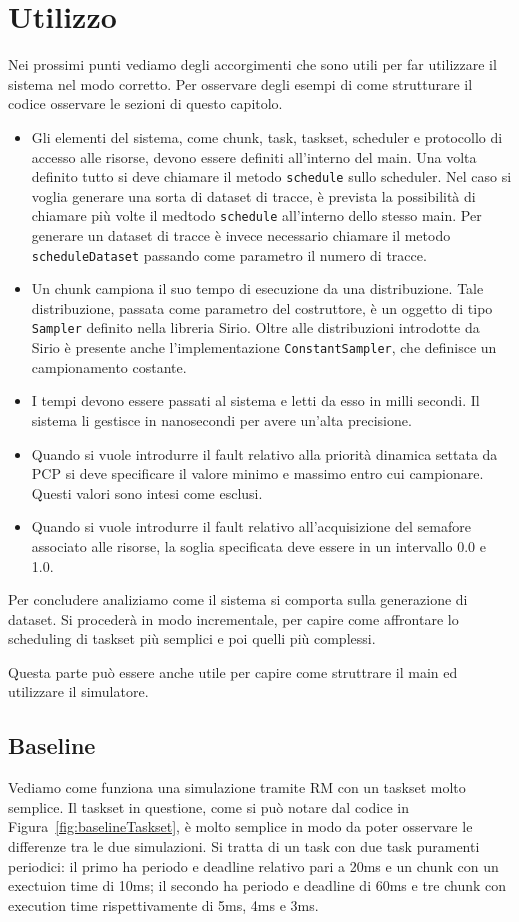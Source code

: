 \chapter{Utilizzo}
Nei prossimi punti vediamo degli accorgimenti che sono utili per far utilizzare il sistema nel modo corretto. Per osservare degli esempi di come strutturare il codice osservare le sezioni di questo capitolo.
\begin{itemize}
    \item Gli elementi del sistema, come chunk, task, taskset, scheduler e protocollo di accesso alle risorse, devono essere definiti all'interno del main. Una volta definito tutto si deve chiamare il metodo \texttt{schedule} sullo scheduler. Nel caso si voglia generare una sorta di dataset di tracce, è prevista la possibilità di chiamare più volte il medtodo \texttt{schedule} all'interno dello stesso main. Per generare un dataset di tracce è invece necessario chiamare il metodo \texttt{scheduleDataset} passando come parametro il numero di tracce.
    \item Un chunk campiona il suo tempo di esecuzione da una distribuzione. Tale distribuzione, passata come parametro del costruttore, è un oggetto di tipo \texttt{Sampler} definito nella libreria Sirio. Oltre alle distribuzioni introdotte da Sirio è presente anche l'implementazione \texttt{ConstantSampler}, che definisce un campionamento costante.
    \item I tempi devono essere passati al sistema e letti da esso in milli secondi. Il sistema li gestisce in nanosecondi per avere un'alta precisione.
    \item Quando si vuole introdurre il fault relativo alla priorità dinamica settata da PCP si deve specificare il valore minimo e massimo entro cui campionare. Questi valori sono intesi come esclusi.
    \item Quando si vuole introdurre il fault relativo all'acquisizione del semafore associato alle risorse, la soglia specificata deve essere in un intervallo 0.0 e 1.0.
\end{itemize}
Per concludere analiziamo come il sistema si comporta sulla generazione di dataset. Si procederà in modo incrementale, per capire come affrontare lo scheduling di taskset più semplici e poi quelli più complessi.

Questa parte può essere anche utile per capire come struttrare il main ed utilizzare il simulatore.

\section{Baseline}
Vediamo come funziona una simulazione tramite RM con un taskset molto semplice. Il taskset in questione, come si può notare dal codice in Figura~\ref{fig:baselineTaskset}, è molto semplice in modo da poter osservare le differenze tra le due simulazioni. Si tratta di un task con due task puramenti periodici: il primo ha periodo e deadline relativo pari a 20ms e un chunk con un exectuion time di 10ms; il secondo ha periodo e deadline di 60ms e tre chunk con execution time rispettivamente di 5ms, 4ms e 3ms.

